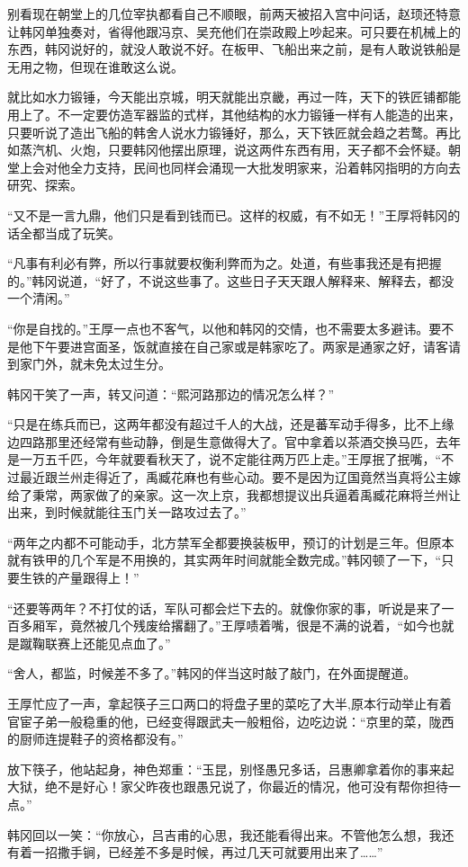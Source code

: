 别看现在朝堂上的几位宰执都看自己不顺眼，前两天被招入宫中问话，赵顼还特意让韩冈单独奏对，省得他跟冯京、吴充他们在崇政殿上吵起来。可只要在机械上的东西，韩冈说好的，就没人敢说不好。在板甲、飞船出来之前，是有人敢说铁船是无用之物，但现在谁敢这么说。

就比如水力锻锤，今天能出京城，明天就能出京畿，再过一阵，天下的铁匠铺都能用上了。不一定要仿造军器监的式样，其他结构的水力锻锤一样有人能造的出来，只要听说了造出飞船的韩舍人说水力锻锤好，那么，天下铁匠就会趋之若鹜。再比如蒸汽机、火炮，只要韩冈他摆出原理，说这两件东西有用，天子都不会怀疑。朝堂上会对他全力支持，民间也同样会涌现一大批发明家来，沿着韩冈指明的方向去研究、探索。

“又不是一言九鼎，他们只是看到钱而已。这样的权威，有不如无！”王厚将韩冈的话全都当成了玩笑。

“凡事有利必有弊，所以行事就要权衡利弊而为之。处道，有些事我还是有把握的。”韩冈说道，“好了，不说这些事了。这些日子天天跟人解释来、解释去，都没一个清闲。”

“你是自找的。”王厚一点也不客气，以他和韩冈的交情，也不需要太多避讳。要不是他下午要进宫面圣，饭就直接在自己家或是韩家吃了。两家是通家之好，请客请到家门外，就未免太过生分。

韩冈干笑了一声，转又问道：“熙河路那边的情况怎么样？”

“只是在练兵而已，这两年都没有超过千人的大战，还是蕃军动手得多，比不上缘边四路那里还经常有些动静，倒是生意做得大了。官中拿着以茶酒交换马匹，去年是一万五千匹，今年就要看秋天了，说不定能往两万匹上走。”王厚抿了抿嘴，“不过最近跟兰州走得近了，禹臧花麻也有些心动。要不是因为辽国竟然当真将公主嫁给了秉常，两家做了的亲家。这一次上京，我都想提议出兵逼着禹臧花麻将兰州让出来，到时候就能往玉门关一路攻过去了。”

“两年之内都不可能动手，北方禁军全都要换装板甲，预订的计划是三年。但原本就有铁甲的几个军是不用换的，其实两年时间就能全数完成。”韩冈顿了一下，“只要生铁的产量跟得上！”

“还要等两年？不打仗的话，军队可都会烂下去的。就像你家的事，听说是来了一百多厢军，竟然被几个残废给撂翻了。”王厚啧着嘴，很是不满的说着，“如今也就是蹴鞠联赛上还能见点血了。”

“舍人，都监，时候差不多了。”韩冈的伴当这时敲了敲门，在外面提醒道。

王厚忙应了一声，拿起筷子三口两口的将盘子里的菜吃了大半,原本行动举止有着官宦子弟一般稳重的他，已经变得跟武夫一般粗俗，边吃边说：“京里的菜，陇西的厨师连提鞋子的资格都没有。”

放下筷子，他站起身，神色郑重：“玉昆，别怪愚兄多话，吕惠卿拿着你的事来起大狱，绝不是好心！家父昨夜也跟愚兄说了，你最近的情况，他可没有帮你担待一点。”

韩冈回以一笑：“你放心，吕吉甫的心思，我还能看得出来。不管他怎么想，我还有着一招撒手锏，已经差不多是时候，再过几天可就要用出来了……”

